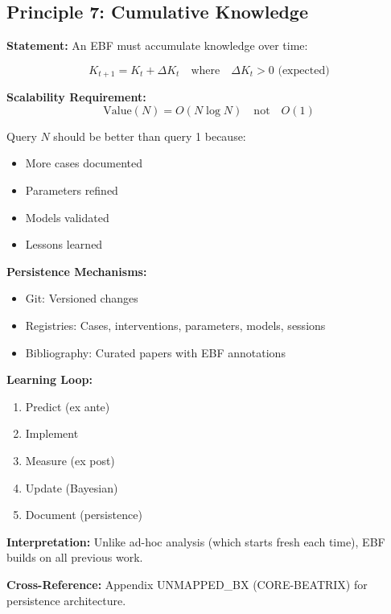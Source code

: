 \subsection{Principle 7: Cumulative Knowledge}

\begin{tcolorbox}[colback=gray!5!white, colframe=gray!75!black,
    title=Axiom UNMAPPED_PR-7: Knowledge Accumulation]

\textbf{Statement:} An EBF must accumulate knowledge over time:

\begin{equation}
K_{t+1} = K_t + \Delta K_t \quad \text{where} \quad \Delta K_t > 0 \text{ (expected)}
\end{equation}

\textbf{Scalability Requirement:}
\begin{equation}
\text{Value}(N) = O(N \log N) \quad \text{not} \quad O(1)
\end{equation}

Query $N$ should be better than query 1 because:
\begin{itemize}[nosep]
    \item More cases documented
    \item Parameters refined
    \item Models validated
    \item Lessons learned
\end{itemize}

\textbf{Persistence Mechanisms:}
\begin{itemize}[nosep]
    \item Git: Versioned changes
    \item Registries: Cases, interventions, parameters, models, sessions
    \item Bibliography: Curated papers with EBF annotations
\end{itemize}

\textbf{Learning Loop:}
\begin{enumerate}
    \item Predict (ex ante)
    \item Implement
    \item Measure (ex post)
    \item Update (Bayesian)
    \item Document (persistence)
\end{enumerate}

\textbf{Interpretation:} Unlike ad-hoc analysis (which starts fresh each time), EBF builds on all previous work.

\textbf{Cross-Reference:} Appendix UNMAPPED_BX (CORE-BEATRIX) for persistence architecture.

\end{tcolorbox}


